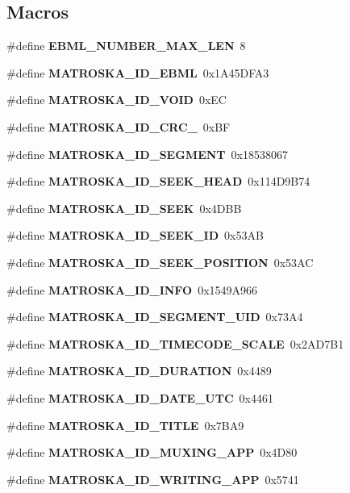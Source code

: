 \subsection*{Macros}
\begin{DoxyCompactItemize}
\item 
\#define {\bf E\+B\+M\+L\+\_\+\+N\+U\+M\+B\+E\+R\+\_\+\+M\+A\+X\+\_\+\+L\+E\+N}~8
\item 
\#define {\bf M\+A\+T\+R\+O\+S\+K\+A\+\_\+\+I\+D\+\_\+\+E\+B\+M\+L}~0x1\+A45\+D\+F\+A3
\item 
\#define {\bf M\+A\+T\+R\+O\+S\+K\+A\+\_\+\+I\+D\+\_\+\+V\+O\+I\+D}~0x\+E\+C
\item 
\#define {\bf M\+A\+T\+R\+O\+S\+K\+A\+\_\+\+I\+D\+\_\+\+C\+R\+C\+\_}~0x\+B\+F
\item 
\#define {\bf M\+A\+T\+R\+O\+S\+K\+A\+\_\+\+I\+D\+\_\+\+S\+E\+G\+M\+E\+N\+T}~0x18538067
\item 
\#define {\bf M\+A\+T\+R\+O\+S\+K\+A\+\_\+\+I\+D\+\_\+\+S\+E\+E\+K\+\_\+\+H\+E\+A\+D}~0x114\+D9\+B74
\item 
\#define {\bf M\+A\+T\+R\+O\+S\+K\+A\+\_\+\+I\+D\+\_\+\+S\+E\+E\+K}~0x4\+D\+B\+B
\item 
\#define {\bf M\+A\+T\+R\+O\+S\+K\+A\+\_\+\+I\+D\+\_\+\+S\+E\+E\+K\+\_\+\+I\+D}~0x53\+A\+B
\item 
\#define {\bf M\+A\+T\+R\+O\+S\+K\+A\+\_\+\+I\+D\+\_\+\+S\+E\+E\+K\+\_\+\+P\+O\+S\+I\+T\+I\+O\+N}~0x53\+A\+C
\item 
\#define {\bf M\+A\+T\+R\+O\+S\+K\+A\+\_\+\+I\+D\+\_\+\+I\+N\+F\+O}~0x1549\+A966
\item 
\#define {\bf M\+A\+T\+R\+O\+S\+K\+A\+\_\+\+I\+D\+\_\+\+S\+E\+G\+M\+E\+N\+T\+\_\+\+U\+I\+D}~0x73\+A4
\item 
\#define {\bf M\+A\+T\+R\+O\+S\+K\+A\+\_\+\+I\+D\+\_\+\+T\+I\+M\+E\+C\+O\+D\+E\+\_\+\+S\+C\+A\+L\+E}~0x2\+A\+D7\+B1
\item 
\#define {\bf M\+A\+T\+R\+O\+S\+K\+A\+\_\+\+I\+D\+\_\+\+D\+U\+R\+A\+T\+I\+O\+N}~0x4489
\item 
\#define {\bf M\+A\+T\+R\+O\+S\+K\+A\+\_\+\+I\+D\+\_\+\+D\+A\+T\+E\+\_\+\+U\+T\+C}~0x4461
\item 
\#define {\bf M\+A\+T\+R\+O\+S\+K\+A\+\_\+\+I\+D\+\_\+\+T\+I\+T\+L\+E}~0x7\+B\+A9
\item 
\#define {\bf M\+A\+T\+R\+O\+S\+K\+A\+\_\+\+I\+D\+\_\+\+M\+U\+X\+I\+N\+G\+\_\+\+A\+P\+P}~0x4\+D80
\item 
\#define {\bf M\+A\+T\+R\+O\+S\+K\+A\+\_\+\+I\+D\+\_\+\+W\+R\+I\+T\+I\+N\+G\+\_\+\+A\+P\+P}~0x5741
\item 

\end{DoxyCompactItemize}
